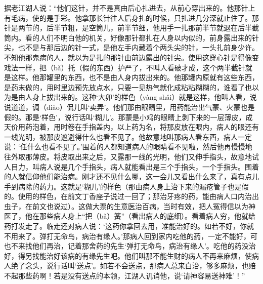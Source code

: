 \documentclass[12pt,UTF8]{ctexbook}
\begin{document}
据老江湖人说：“他们这针，并不是真由后心扎进去，从前心穿出来的。他那针上有毛病，使的是手彩。他拿那长针往人后身扎的时候，只扎进几分深就止住了。那针是两节的，后半节粗，是空筒儿，前半节细，他用手一扎那前半节就退在后半截筒内。看的人们不明白他的机关，好像那针都扎在人身以内似的，前身露出来的针尖，也不是与那后边的针一式，是他左手内藏着个两头尖的针，一头扎前身少许。不知他那鬼病的人，就以为是扎的那针由前边露出的针尖。使用这穿心针是得像变戏法一样，把（bǎ）托（假的东西）护严了，不叫人看破才成，这个两半截针就是这样。他那罐里的东西，也不是由人身内拔出来的。他那罐内原就有这些东西，是药末做的，用时里边预先放点水，只要一见热气就化成粘粘糊糊的，谁看了也以为是由人身上拔出来的。这种‘大卯’的样色（yàng shǎi）就是这样，他叫人看，说说道道，调（diào）侃儿叫‘卖弄’。他们那由眼睛里，用药能治出气蒙、火蒙也是假的。那是‘样色’，说行话叫‘糊儿’。那蒙是小鸡的眼睛上剥下来的一层薄皮，成天价用药泡着，用时卷在手指盖内，以上药为名，将那皮放在眼内，病人的眼还有一线光明，被那皮遮避得什么也看不见了。他故意地叫那病人看东西，病人一定说：‘任什么也看不见了。’围着的人都知道病人的眼睛看不见啦，然后他再慢慢地往外取那薄皮。将皮取出来之后，又露那一线的光明，他们又伸手指头，故意地试人目力，叫病人说是几个手指头，病人就能看出是三个手指头，一个手指头。围着的人就信仰他们能治病。刚才还不见什么哪，这一会儿又看出什么来了，真有点儿手到病除的药力。这就是‘糊儿’的样色（那由病人身上治下来的漏疮管子也是假的。使用的样色，在前文丁香座子说过一回了；那治牙疼的药，能由病人口内治出虫子，在前文也说过）。这做大票的生意医治百病，当时有效，把人冤得信以为神医了，他在那些病人身上“把（bǎ）簧”（看出病人的底细）。看着病人穷，他就给药打发走了。临走还对病人说：‘这药你拿回去用，准能治好的。如若不好，你就不用来了。弹打无命鸟，病治有缘人。’那病人回到家内吃他的药，一定不能好，可也不来找他们再治，记着那舍药的先生‘弹打无命鸟，病治有缘人’。吃他的药没治好，得另找能治好该病的有缘先生吧。他们叫那不能生财的病人不再来麻烦，使病人绝了念头，说行话叫‘送点’。如若不会送点，那病人总来白治，够多麻烦，也赔不起那些药啊！若是没有送点的本领，江湖人讥诮他，说‘请神容易送神难’！”
\end{document}
